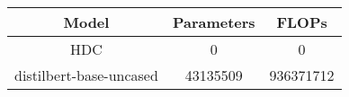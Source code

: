 \begin{tabular}{ccc}
\toprule
Model & Parameters & FLOPs \\
\midrule
HDC & 0 & 0 \\
distilbert-base-uncased & 43135509 & 936371712 \\
\bottomrule
\end{tabular}
